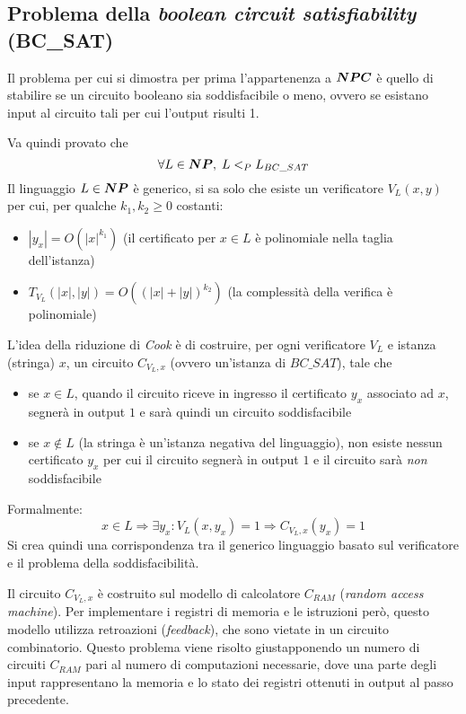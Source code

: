 \subsection{Problema della \emph{boolean circuit satisfiability} (BC\_SAT)}

Il problema per cui si dimostra per prima l'appartenenza a $\bm{NPC}$ è quello di stabilire se un circuito booleano sia soddisfacibile o meno, ovvero se esistano input al circuito tali per cui l'output risulti 1.

Va quindi provato che 
$$
\forall L \in \bm{NP}, \; L <_P L_{BC\_SAT}
$$
Il linguaggio $L \in \bm{NP}$ è generico, si sa solo che esiste un verificatore $V_L(x,y)$ per cui, per qualche $k_1, k_2 \geq 0$ costanti:
\begin{itemize}
    \item $|y_x| = O (|x|^{k_1})$ (il certificato per $x \in L$ è polinomiale nella taglia dell'istanza)
    \item $ T_{V_{L}} (|x|, |y|) = O \left( \left( |x|+|y| \right)^{k_{2}} \right)$ 
        (la complessità della verifica è polinomiale)
\end{itemize}

L'idea della riduzione di \emph{Cook} è di costruire, per ogni verificatore $V_L$ e istanza (stringa) $x$, un circuito $C_{V_L,x}$ (ovvero un'istanza di $BC\_SAT$), tale che
\begin{itemize}
    \item se $x \in L$, quando il circuito riceve in ingresso il certificato $y_x$ associato ad $x$, segnerà in output $1$ e sarà quindi un circuito soddisfacibile
    \item se $x \notin L$ (la stringa è un'istanza negativa del linguaggio), non esiste nessun certificato $y_x$ per cui il circuito segnerà in output $1$ e il circuito sarà \emph{non} soddisfacibile
\end{itemize}
Formalmente:
\begin{equation*}
    x \in L \Rightarrow \exists y_x : V_L \left( x, y_x \right) = 1 \Rightarrow C_{V_L,x} \left( y_x \right) = 1
\end{equation*}
Si crea quindi una corrispondenza tra il generico linguaggio basato sul verificatore e il problema della soddisfacibilità.

Il circuito $C_{V_L,x}$ è costruito sul modello di calcolatore $C_{RAM}$ (\emph{random access machine}). Per implementare i registri di memoria e le istruzioni però, questo modello utilizza retroazioni (\emph{feedback}), che sono vietate in un circuito combinatorio. Questo problema viene risolto giustapponendo un numero di circuiti $C_{RAM}$ pari al numero di computazioni necessarie, dove una parte degli input rappresentano la memoria e lo stato dei registri ottenuti in output al passo precedente.

